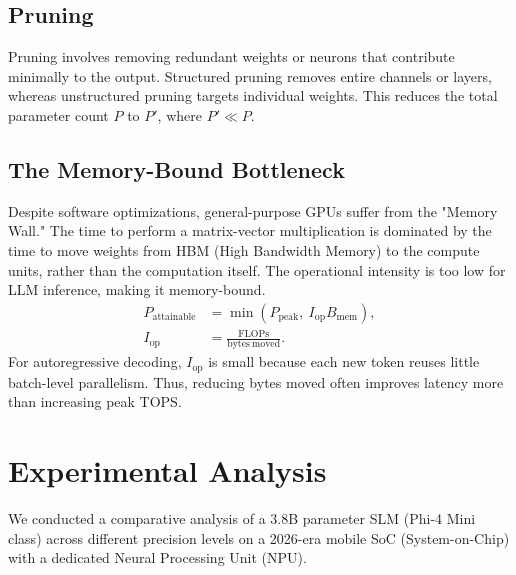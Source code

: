 \documentclass[twocolumn,10pt]{article}
\begin{document}
\subsection{Pruning}
Pruning involves removing redundant weights or neurons that contribute minimally to the output. Structured pruning removes entire channels or layers, whereas unstructured pruning targets individual weights. This reduces the total parameter count $P$ to $P'$, where $P' \ll P$.

\subsection{The Memory-Bound Bottleneck}
Despite software optimizations, general-purpose GPUs suffer from the "Memory Wall." The time to perform a matrix-vector multiplication is dominated by the time to move weights from HBM (High Bandwidth Memory) to the compute units, rather than the computation itself. The operational intensity is too low for LLM inference, making it memory-bound.
\begin{equation}
\begin{aligned}
P_{\mathrm{attainable}}
&=\min\left(P_{\mathrm{peak}},\ I_{\mathrm{op}} B_{\mathrm{mem}}\right),\\
I_{\mathrm{op}}
&=\frac{\mathrm{FLOPs}}{\mathrm{bytes\ moved}}.
\end{aligned}
\label{eq:roofline}
\end{equation}
For autoregressive decoding, $I_{\mathrm{op}}$ is small because each new token reuses little batch-level parallelism. Thus, reducing bytes moved often improves latency more than increasing peak TOPS.

\section{Experimental Analysis}
We conducted a comparative analysis of a 3.8B parameter SLM (Phi-4 Mini class) across different precision levels on a 2026-era mobile SoC (System-on-Chip) with a dedicated Neural Processing Unit (NPU).
\end{document}
